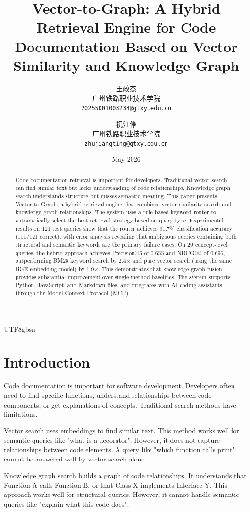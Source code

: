 \documentclass[11pt]{article}
\title{Vector-to-Graph: A Hybrid Retrieval Engine for Code Documentation Based on Vector Similarity and Knowledge Graph}
\author{
    王政杰 \\
    广州铁路职业技术学院 \\
    \texttt{20255001003234@gtxy.edu.cn}
    \and
    祝江停 \\
    广州铁路职业技术学院 \\
    \texttt{zhujiangting@gtxy.edu.cn}
}
\date{May 2026}
\begin{document}
\begin{CJK*}{UTF8}{gbsn}

\maketitle

\begin{abstract}
Code documentation retrieval is important for developers. Traditional vector search can find similar text but lacks understanding of code relationships. Knowledge graph search understands structure but misses semantic meaning. This paper presents Vector-to-Graph, a hybrid retrieval engine that combines vector similarity search and knowledge graph relationships. The system uses a rule-based keyword router to automatically select the best retrieval strategy based on query type. Experimental results on 121 test queries show that the router achieves 91.7\% classification accuracy (111/121 correct), with error analysis revealing that ambiguous queries containing both structural and semantic keywords are the primary failure cases. On 29 concept-level queries, the hybrid approach achieves Precision@5 of 0.655 and NDCG@5 of 0.696, outperforming BM25 keyword search by 2.4$\times$ and pure vector search (using the same BGE embedding model) by 1.9$\times$. This demonstrates that knowledge graph fusion provides substantial improvement over single-method baselines. The system supports Python, JavaScript, and Markdown files, and integrates with AI coding assistants through the Model Context Protocol (MCP)~\cite{mcp2024}.
\end{abstract}

\section{Introduction}

Code documentation is important for software development. Developers often need to find specific functions, understand relationships between code components, or get explanations of concepts. Traditional search methods have limitations.

Vector search uses embeddings to find similar text. This method works well for semantic queries like "what is a decorator". However, it does not capture relationships between code elements. A query like "which function calls print" cannot be answered well by vector search alone.

Knowledge graph search builds a graph of code relationships. It understands that Function A calls Function B, or that Class X implements Interface Y. This approach works well for structural queries. However, it cannot handle semantic queries like "explain what this code does".


\end{CJK*}
\end{document}
